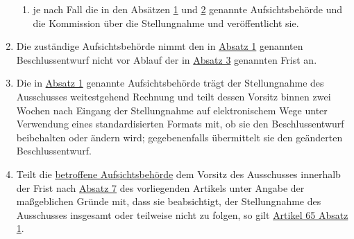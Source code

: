\begin{enumerate}
\begin{enumerate}
    \item je nach Fall die in den Absätzen \hyperref[itm:64-1]{1} und \hyperref[itm:64-2]{2} genannte Aufsichtsbehörde
     und die Kommission über die Stellungnahme und veröffentlicht sie.
    \label{itm:64-5b}

  \end{enumerate}

  \item Die zuständige Aufsichtsbehörde nimmt den in \hyperref[itm:64-1]{Absatz 1} genannten Beschlussentwurf nicht vor
   Ablauf der in \hyperref[itm:64-3]{Absatz 3} genannten Frist an.
  \label{itm:64-6}

  \item Die in \hyperref[itm:64-1]{Absatz 1} genannte Aufsichtsbehörde trägt der Stellungnahme des Ausschusses
   weitestgehend Rechnung und teilt dessen Vorsitz binnen zwei Wochen nach Eingang der Stellungnahme auf elektronischem
   Wege unter Verwendung eines standardisierten Formats mit, ob sie den Beschlussentwurf beibehalten oder ändern wird;
   gegebenenfalls übermittelt sie den geänderten Beschlussentwurf.
  \label{itm:64-7}

  \item Teilt die \hyperref[itm:04-22]{betroffene Aufsichtsbehörde} dem Vorsitz des Ausschusses innerhalb der Frist nach \hyperref[itm:64-7]
   {Absatz 7} des vorliegenden Artikels unter Angabe der maßgeblichen Gründe mit, dass sie beabsichtigt, der
   Stellungnahme des Ausschusses insgesamt oder teilweise nicht zu folgen, so gilt \hyperref[itm:65-2]{Artikel 65
   Absatz 1}.
  \label{itm:64-8}

\end{enumerate}


